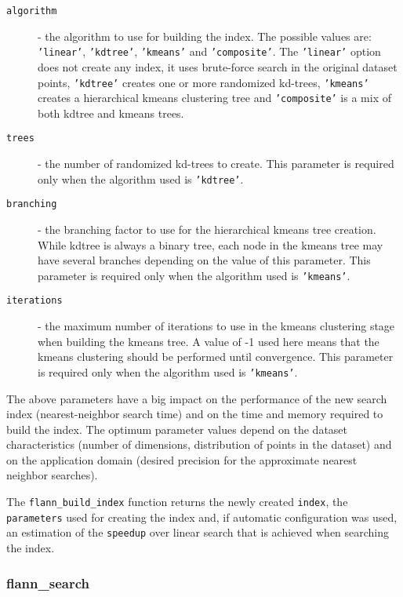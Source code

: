 \documentclass[letter,10pt]{article}
\begin{document}
\begin{description}
\item[\texttt{algorithm}] - the algorithm to use for building the index.
The possible values are: \texttt{'linear'}, \texttt{'kdtree'},
\texttt{'kmeans'} and \texttt{'composite'}. The \texttt{'linear'} option
does not create any index, it uses brute-force search in the original
dataset points, \texttt{'kdtree'} creates one or more randomized kd-trees,
\texttt{'kmeans'} creates a hierarchical kmeans clustering tree and
\texttt{'composite'} is a mix of both kdtree and kmeans trees.
\item[\texttt{trees}] - the number of randomized kd-trees to
create. This parameter is required only when the algorithm used is
\texttt{'kdtree'}.
\item[\texttt{branching}] - the branching factor to use for
the hierarchical kmeans tree creation. While kdtree is always a binary
tree, each node in the kmeans tree may have several branches depending on
the value of this parameter. This parameter is required only when the
algorithm used is \texttt{'kmeans'}.
\item[\texttt{iterations}] - the maximum number of iterations to
use in the kmeans clustering stage when building the kmeans tree. A value
of -1 used here means that the kmeans clustering should be performed until
convergence. This parameter is required only when the algorithm used is
\texttt{'kmeans'}.
\end{description}

The above parameters have a big impact on the performance of the new search
index (nearest-neighbor search time) and on the time and memory required to
build the index. The optimum parameter values depend on the dataset
characteristics (number of dimensions, distribution of points in the
dataset) and on the application domain (desired precision for the
approximate nearest neighbor searches).




The \texttt{flann\_build\_index} function returns the newly created
\texttt{index}, the \texttt{parameters} used for creating the index and, if
automatic configuration was used, an estimation of the \texttt{speedup}
over linear search that is achieved when searching the index.




\subsubsection{flann\_search}
\end{document}

